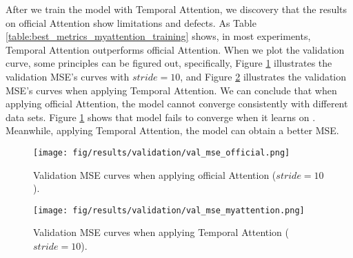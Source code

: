 \documentclass[
twocolumn,
]{ceurart}
\begin{document}
After we train the model with Temporal Attention, we discovery that the results on official Attention show limitations and defects. As Table \ref{table:best_metrics_myattention_training} shows, in most experiments, Temporal Attention outperforms official Attention. When we plot the validation curve, some principles can be figured out, specifically, Figure \ref{fig:val_mse_official} illustrates the validation MSE's curves with $stride=10$, and Figure \ref{fig:val_mse_myattention} illustrates the validation MSE's curves when applying Temporal Attention. We can conclude that when applying official Attention, the model cannot converge consistently with different data sets. Figure \ref{fig:val_mse_official} shows that model fails to converge when it learns on . Meanwhile, applying Temporal Attention, the model can obtain a better MSE.

\begin{figure}[!htbp]
    \centering
    \texttt{[image: fig/results/validation/val\_mse\_official.png]}
    \caption{Validation MSE curves when applying official Attention ($stride=10$).}
    \label{fig:val_mse_official}
\end{figure}

\begin{figure}[!htbp]
    \centering
    \texttt{[image: fig/results/validation/val\_mse\_myattention.png]}
    \caption{Validation MSE curves when applying Temporal Attention ($stride=10$).}
    \label{fig:val_mse_myattention}
\end{figure}

\end{document}
